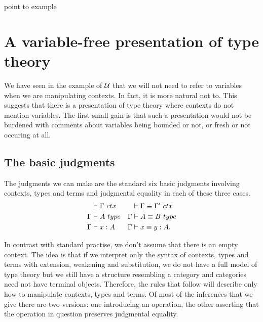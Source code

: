 {\color{red} point to example}

\section{A variable-free presentation of type theory}
We have seen in the example of $\mathcal{U}$ that we will not need to refer to variables
when we are manipulating contexts. In fact, it is more natural not to.
This suggests that there is a presentation
of type theory where contexts do not mention variables. The first small gain is that such a presentation
would not be burdened with comments about variables being bounded or not, or fresh or
not occuring at all.

\subsection{The basic judgments}
The judgments we can make are the standard six basic judgments involving contexts, types and terms and
judgmental equality in each of these three cases.
\begin{align*}
\jctx*{\Gamma} & \jctxeq*{\Gamma}{\Gamma'}\\
\jtype*{\Gamma}{A} & \jtypeeq*{\Gamma}{A}{B}\\
\jterm*{\Gamma}{A}{x} & \jtermeq*{\Gamma}{A}{x}{y}.
\end{align*}

In contrast with standard practise, we don't assume that there is an empty context. The idea is that
if we interpret only the syntax of contexts, types and terms with extension, weakening and
substitution, we do not have a full model of type theory but we still have a 
structure resembling a category and categories need not have terminal objects. Therefore,
the rules that follow will describe only how to manipulate contexts, types and terms.
Of most of the inferences that we give there are two versions: one introducing an operation, the other asserting that the operation in question preserves judgmental equality. 


